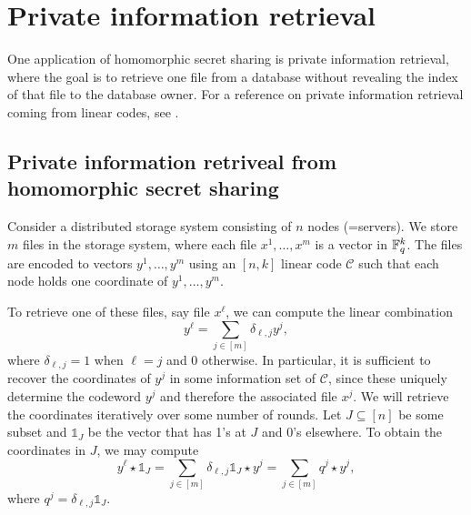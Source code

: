 \documentclass[../main.tex]{subfiles}
\begin{document}
\section{Private information retrieval}

One application of homomorphic secret sharing is private information retrieval, where the goal is to retrieve one file from a database without revealing the index of that file to the database owner. For a reference on private information retrieval coming from linear codes, see \cite{freij2017private}.

\subsection{Private information retriveal from homomorphic secret sharing}

Consider a distributed storage system consisting of $n$ nodes (=servers). We store $m$ files in the storage system, where each file $x^1, \dots, x^m$ is a vector in $\mathbb{F}_q^k$. The files are encoded to vectors $y^1, \dots, y^m$ using an $[n, k]$ linear code $\mathcal{C}$ such that each node holds one coordinate of $y^1, \dots, y^m$.

To retrieve one of these files, say file $x^\ell$, we can compute the linear combination
\begin{equation*}
    y^\ell = \sum_{j \in [m]} \delta_{\ell, j} y^j,
\end{equation*}
where $\delta_{\ell, j} = 1$ when $\ell = j$ and $0$ otherwise. In particular, it is sufficient to recover the coordinates of $y^j$ in some information set of $\mathcal{C}$, since these uniquely determine the codeword $y^j$ and therefore the associated file $x^j$. We will retrieve the coordinates iteratively over some number of rounds. Let $J \subseteq [n]$ be some subset and $\mathds{1}_J$ be the vector that has 1's at $J$ and 0's elsewhere. To obtain the coordinates in $J$, we may compute
\begin{equation*}
    y^\ell \star \mathds{1}_J = \sum_{j \in [m]} \delta_{\ell, j} \mathds{1}_J \star y^j = \sum_{j \in [m]} q^j \star y^j,
\end{equation*}
where $q^j = \delta_{\ell, j} \mathds{1}_J$.
\end{document}
